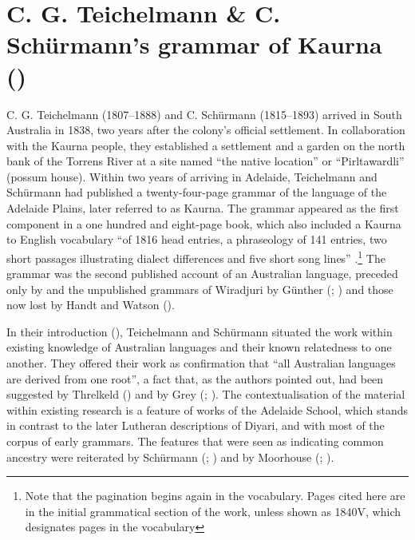 \section{C. G. Teichelmann \& C. Schürmann’s grammar of Kaurna (\citeyear{teichelmann_outlines_1840})}
\label{sec:key:5.2}

C. G. Teichelmann (1807--1888) and C. Schürmann (1815--1893) arrived in South Australia in 1838, two years after the colony’s official settlement. In collaboration with the Kaurna people, they established a settlement and a garden on the north bank of the Torrens River at a site named “the native location” or “Pirltawardli” (possum house). Within two years of arriving in Adelaide, Teichelmann and Schürmann had published a twenty-four-page grammar of the language of the Adelaide Plains, later referred to as Kaurna. The grammar appeared as the first component in a one hundred and eight-page book, which also included a Kaurna to English vocabulary “of 1816 head entries, a phraseology of 141 entries, two short passages illustrating dialect differences and five short song lines” \citep[87]{amery_warrabarna_2016}.\footnote{Note that the pagination begins again in the vocabulary. Pages cited here are in the initial grammatical section of the work, unless shown as 1840V, which designates pages in the vocabulary}  The grammar was the second published account of an Australian language, preceded only by \citet{threlkeld_australian_1834} and the unpublished grammars of Wiradjuri by Günther (\citeyear{gunther_native_1838}; \citeyear{gunther_lecture_1840}) and those now lost by Handt and Watson ().

In their introduction (\citeyear[vii-viii]{teichelmann_outlines_1840}), Teichelmann and Schürmann situated the work within existing knowledge of Australian languages and their known relatedness to one another. They offered their work as confirmation that “all Australian languages are derived from one root”, a fact that, as the authors pointed out, had been suggested by Threlkeld (\citeyear[10]{threlkeld_australian_1834}) and by Grey (\citeyear{grey_vocabulary_1839}; \citeyear[365--366]{grey_journals_1841}). The contextualisation of the material within existing research is a feature of works of the Adelaide School, which stands in contrast to the later Lutheran descriptions of Diyari, and with most of the corpus of early grammars. The features that were seen as indicating common ancestry were reiterated by Schürmann (\citealt{schurmann_aboriginal_1846}; ) and by Moorhouse (\citealt{moorhouse_vocabulary_1846}; ).
    
